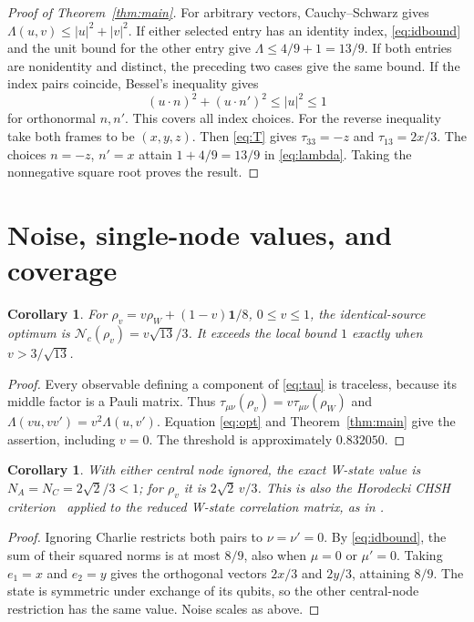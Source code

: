 \documentclass[11pt,a4paper]{article}
\newtheorem{corollary}[theorem]{Corollary}
\newcommand{\Nc}{\mathcal N_c}
\begin{document}
\begin{proof}[Proof of Theorem~\ref{thm:main}]
For arbitrary vectors, Cauchy--Schwarz gives
$\Lambda(u,v)\leq|u|^2+|v|^2$.
If either selected entry has an identity index, \eqref{eq:idbound}
and the unit bound for the other entry give $\Lambda\leq4/9+1=13/9$.
If both entries are nonidentity and distinct, the preceding two cases
give the same bound. If the index pairs coincide, Bessel's inequality
gives
\[
 (u\cdot n)^2+(u\cdot n')^2\leq|u|^2\leq1
\]
for orthonormal $n,n'$. This covers all index choices.
For the reverse inequality take both frames to be $(x,y,z)$.
Then \eqref{eq:T} gives $\tau_{33}=-z$ and $\tau_{13}=2x/3$.
The choices $n=-z$, $n'=x$ attain $1+4/9=13/9$ in
\eqref{eq:lambda}. Taking the nonnegative square root proves the result.
\end{proof}

\section{Noise, single-node values, and coverage}
\begin{corollary}\label{cor:noise}
For $\rho_v=v\rho_W+(1-v)\mathbf1/8$, $0\leq v\leq1$,
the identical-source optimum is $\Nc(\rho_v)=v\sqrt{13}/3$.
It exceeds the local bound $1$ exactly when $v>3/\sqrt{13}$.
\end{corollary}
\begin{proof}
Every observable defining a component of \eqref{eq:tau} is traceless,
because its middle factor is a Pauli matrix. Thus
$\tau_{\mu\nu}(\rho_v)=v\tau_{\mu\nu}(\rho_W)$ and
$\Lambda(vu,vv')=v^2\Lambda(u,v')$.
Equation \eqref{eq:opt} and Theorem~\ref{thm:main} give the assertion,
including $v=0$. The threshold is approximately $0.832050$.
\end{proof}

\begin{corollary}\label{cor:single}
With either central node ignored, the exact W-state value is
$N_A=N_C=2\sqrt2/3<1$; for $\rho_v$ it is $2\sqrt2\,v/3$.
This is also the Horodecki CHSH criterion~\cite{HHH} applied to the
reduced W-state correlation matrix, as in \cite[Section III B]{CK}.
\end{corollary}
\begin{proof}
Ignoring Charlie restricts both pairs to $\nu=\nu'=0$.
By \eqref{eq:idbound}, the sum of their squared norms is at most $8/9$,
also when $\mu=0$ or $\mu'=0$. Taking $e_1=x$ and $e_2=y$
gives the orthogonal vectors $2x/3$ and $2y/3$, attaining $8/9$.
The state is symmetric under exchange of its qubits, so the other
central-node restriction has the same value. Noise scales as above.
\end{proof}
\end{document}
